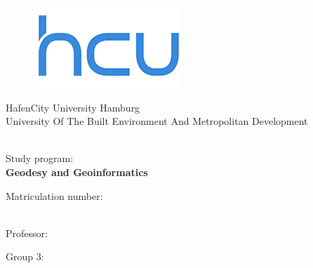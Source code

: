 \begin{titlepage}

\begin{center}
	
\begin{figure}
\centering
\includegraphics[width=0.2\linewidth]{source/images/hcu_logo}	
\end{figure}

{\normalsize HafenCity University Hamburg}\\[1mm]
{\normalsize University Of The Built Environment And Metropolitan Development}\\[8mm] 
\textbf{\large{\artDerArbeit}}\\[20mm]

\textbf{\LARGE \TitelArbeit}\vspace{3cm}

\vspace{0.2cm}

{\normalsize Study program:}\\[.8mm]
\textbf{{\large Geodesy and Geoinformatics}\\[3mm]}

\vspace{0.2cm}

{\normalsize Matriculation number:}\\[.8mm]
\textbf{{\large \Matrikelnummer}\\[3mm]}

\vspace{0.2cm}

{\normalsize Professor:}\\[.8mm]
\textbf{{\large \PrueferEins}}

\vspace{0.2cm}

{\normalsize Group 3:}\\[.8mm]
\textbf{\large \DeinName}\\
\bigskip
\bigskip
\bigskip
\bigskip

\Datum
\end{center}
\end{titlepage}